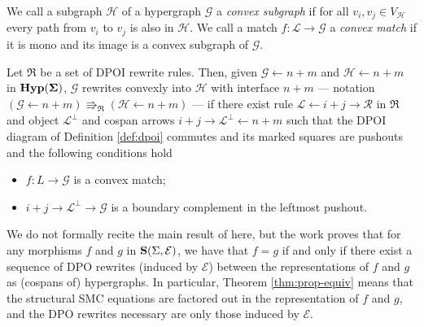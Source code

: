 \begin{definition}
We call a subgraph $\mathcal{H}$ of a hypergraph $\mathcal{G}$ a \emph{convex subgraph} if for all $v_i, v_j \in V_{\mathcal{H}}$ every path from $v_i$ to $v_j$ is also in $\mathcal{H}$.
We call a match $f : \mathcal L \to \mathcal G$ a \emph{convex match} if it is mono and its image is a convex subgraph of $\mathcal G$. 
   
\end{definition}

\begin{definition}
\label{def:convex_dpo}
Let $\mathfrak{R}$ be a set of DPOI rewrite rules. 
Then, given $\mathcal G \xleftarrow{} n+m$ and $\mathcal H \xleftarrow{} n + m$ in $\mathbf{Hyp(\Sigma)}$, $\mathcal G$ rewrites convexly into $\mathcal H$ with interface $n + m$ --- notation $(\mathcal G \xleftarrow{} n + m ) \Rrightarrow_{\mathfrak{R}}  (\mathcal H \xleftarrow{} n + m )$ --- if there exist rule $\mathcal L \xleftarrow{} i + j \xrightarrow{} \mathcal R$ in $\mathfrak{R}$ and object $\mathcal{L}^{\bot}$ and cospan arrows $i+j \xrightarrow{} \mathcal{L}^{\bot} \xleftarrow{} n+m$ such that the DPOI diagram of Definition \ref{def:dpoi} commutes and its marked squares are pushouts 
and the following conditions hold
\begin{itemize}
    \item $f : L \to \mathcal G$ is a convex match;
    \item $i + j \to \mathcal{L}^{\bot} \to \mathcal G$ is a boundary complement in the leftmost pushout.
\end{itemize}
\end{definition}
We do not formally recite the main result of \cite{bonchi_string_2022-2} here,  but the work proves that for any morphisms $f$ and $g$ in $\mathbf{S}(\Sigma, \mathcal{E})$,  we have that $f = g$ if and only if there exist a sequence of DPO rewrites (induced by $\mathcal{E}$) between the representations of $f$ and $g$ as (cospans of) hypergraphs.
In particular,  Theorem \ref{thm:prop-equiv} means that the structural SMC equations are factored out in the representation of $f$ and $g$,  and the DPO rewrites necessary are only those induced by $\mathcal{E}$. 

